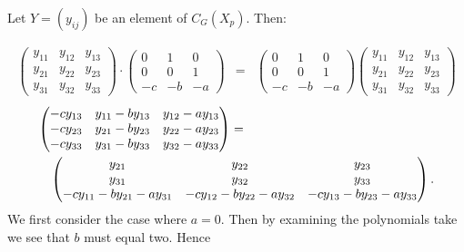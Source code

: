 \documentclass[11pt]{article} \usepackage{amssymb}
\begin{document}
\begin{enumerate}
\begin{enumerate}
\begin{itemize}
        

        Let $Y=(y_{ij})$ be an element of $C_G(X_p)$. Then:
        
        \begin{eqnarray*}
          \begin{pmatrix}
            y_{11}&y_{12}  &y_{13} \\ 
            y_{21}&y_{22}  &y_{23} \\ 
            y_{31}&y_{32}  &y_{33} 
          \end{pmatrix}
          \cdot
          \begin{pmatrix}
            0&1  &0 \\ 
            0&0  &1 \\ 
            -c&-b  &-a 
          \end{pmatrix}
          &=&
          \begin{pmatrix}
            0&1  &0 \\ 
            0&0  &1 \\ 
            -c&-b  &-a 
          \end{pmatrix}
          \begin{pmatrix}
            y_{11}&y_{12}  &y_{13} \\ 
            y_{21}&y_{22}  &y_{23} \\ 
            y_{31}&y_{32}  &y_{33} 
          \end{pmatrix}
        \end{eqnarray*}
        \begin{eqnarray*}
          \lefteqn{
            \begin{pmatrix}
              -cy_{13}&y_{11}-by_{13}  &y_{12}-ay_{13} \\ 
              -cy_{23}&y_{21}-by_{23}  &y_{22}-ay_{23} \\ 
              -cy_{33}&y_{31}-by_{33}  &y_{32}-ay_{33} 
            \end{pmatrix}
            =}
          \\
          &&
          \begin{pmatrix}
            y_{21}&y_{22}  &y_{23} \\ 
            y_{31}&y_{32}  &y_{33} \\ 
            -cy_{11}-by_{21}-ay_{31}&-cy_{12}-by_{22}-ay_{32}&-cy_{13}-by_{23}-ay_{33}
          \end{pmatrix}.
        \end{eqnarray*}
        We first consider the case where $a=0$. Then by examining the 
        polynomials take we see that $b$ must equal two. Hence

\end{itemize}
\end{enumerate}
\end{enumerate}
\end{document}
